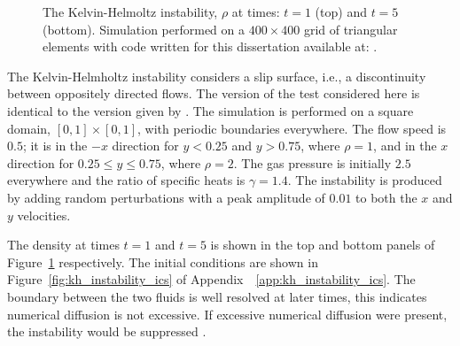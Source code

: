 \begin{figure}[htbp]
\begin{center}
\begin{tabular}{c}
\end{tabular}
\caption{The Kelvin-Helmoltz instability, $\rho$ at times: $t=1$ (top) and $t=5$ (bottom).  Simulation performed on a $400 \times 400$ grid of triangular elements with code written for this dissertation available at: \protect\gitrepo.}
\end{center} 
\label{fig:kh_instability}
\figSpace
\end{figure}

The Kelvin-Helmholtz instability \citep{hydro_stability} considers a slip surface, i.e., a discontinuity between oppositely directed flows.  The version of the test considered here is identical to the version given by \citet{url:athena}.  The simulation is performed on a square domain, $[0,1] \times [0,1]$, with periodic boundaries everywhere.  The flow speed is $0.5$; it is in the $-x$ direction for $ y < 0.25$ and $y > 0.75$, where $\rho = 1$, and in the $x$ direction for $0.25 \le y \le 0.75$, where $\rho = 2$.  The gas pressure is initially $2.5$ everywhere and the ratio of specific heats is $\gamma = 1.4$.  The instability is produced by adding random perturbations with a peak amplitude of $0.01$ to both the $x$ and $y$ velocities. 

The density at times $t=1$ and $t=5$ is shown in the top and bottom panels of Figure~\ref{fig:kh_instability} respectively.  The initial conditions are shown in Figure~\ref{fig:kh_instability_ics} of Appendix~~\ref{app:kh_instability_ics}.  The boundary between the two fluids is well resolved at later times, this indicates numerical diffusion is not excessive.  If excessive numerical diffusion were present, the instability would be suppressed \citep{url:athena}. 

